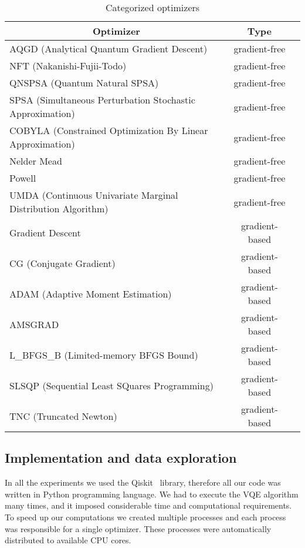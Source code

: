 \begin{table}[H]
    \centering
    \begin{tabular}{|l|c|c|} 
        \hline
        \multicolumn{1}{|c|}{\textbf{Optimizer}} & \textbf{Type}\\
        \hline
        AQGD (Analytical Quantum Gradient Descent) & gradient-free \\ 
        \hline
        NFT (Nakanishi-Fujii-Todo) & gradient-free \\ 
        \hline
        QNSPSA (Quantum Natural SPSA) & gradient-free \\ 
        \hline
        SPSA (Simultaneous Perturbation Stochastic Approximation) & gradient-free \\ 
        \hline
        COBYLA (Constrained Optimization By Linear Approximation) & gradient-free \\ 
        \hline
        Nelder Mead & gradient-free \\ 
        \hline
        Powell & gradient-free \\ 
        \hline
        UMDA (Continuous Univariate Marginal Distribution Algorithm) & gradient-free \\ 
        \hline
        Gradient Descent & gradient-based \\ 
        \hline
        CG (Conjugate Gradient) & gradient-based \\ 
        \hline
        ADAM (Adaptive Moment Estimation) & gradient-based \\ 
        \hline
        AMSGRAD & gradient-based \\ 
        \hline
        L\_BFGS\_B (Limited-memory BFGS Bound) & gradient-based \\ 
        \hline
        SLSQP (Sequential Least SQuares Programming) & gradient-based \\ 
        \hline
        TNC (Truncated Newton) & gradient-based \\ 
        \hline
    \end{tabular}
    \caption{Categorized optimizers}
    \label{tab:optimizers}
\end{table}

\tocless\subsection{Implementation and data exploration}\noindent
In all the experiments we used the Qiskit~\cite{qiskit} library, therefore all our code was written in Python programming language. We had to execute the VQE algorithm many times, and it imposed considerable time and computational requirements. To speed up our computations we created multiple processes and each process was responsible for a single optimizer. These processes were automatically distributed to available CPU cores.

